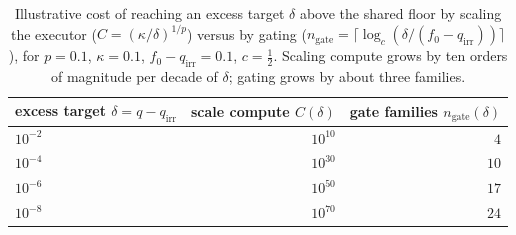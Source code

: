 \documentclass[11pt]{article}
\theoremstyle{definition}
\theoremstyle{remark}
\newcommand{\fesc}{f}
\begin{document}
\begin{table}[h]
\centering
\small
\begin{tabular}{lrr}
\toprule
excess target $\delta=q-q_{\mathrm{irr}}$ & scale compute $C(\delta)$ & gate families $n_{\mathrm{gate}}(\delta)$ \\
\midrule
$10^{-2}$ & $10^{10}$ & $4$ \\
$10^{-4}$ & $10^{30}$ & $10$ \\
$10^{-6}$ & $10^{50}$ & $17$ \\
$10^{-8}$ & $10^{70}$ & $24$ \\
\bottomrule
\end{tabular}
\caption{Illustrative cost of reaching an excess target $\delta$ above the shared floor by scaling the
executor ($C=(\kappa/\delta)^{1/p}$) versus by gating
($n_{\mathrm{gate}}=\lceil\log_c(\delta/(\fesc_0-q_{\mathrm{irr}}))\rceil$), for $p=0.1$, $\kappa=0.1$,
$\fesc_0-q_{\mathrm{irr}}=0.1$, $c=\tfrac12$. Scaling compute grows by ten orders of magnitude per decade of
$\delta$; gating grows by about three families.}\label{tab:sep}
\end{table}
\end{document}
